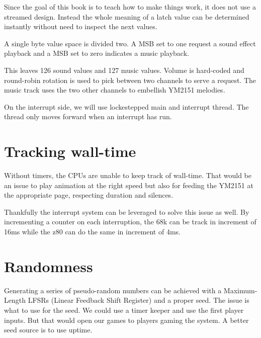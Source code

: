 Since the goal of this book is to teach how to make things work, it does not use a streamed design. Instead the whole meaning of a latch value can be determined instantly without need to inspect the next values.

A single byte value space is divided two. A MSB set to one  request a sound effect playback and a MSB set to zero  indicates a music playback. 

This leaves 126 sound values and 127 music values. Volume is hard-coded and round-robin rotation is used to pick between two channels to serve a request. The music track uses the two other channels to embellish YM2151 melodies. 

On the interrupt side, we will use lockestepped main and interrupt thread. The  thread only moves forward when an interrupt has run.

\pagebreak



\section{Tracking wall-time}

Without timers, the CPUs are unable to keep track of wall-time. That would be an issue to play animation at the right speed but also for feeding the YM2151 at the appropriate page, respecting duration and silences. 

Thankfully the interrupt system can be leveraged to solve this issue as well. By incrementing a counter on each interruption, the 68k can be track in increment of 16ms while the z80 can do the same in increment of 4ms.





\section{Randomness}
Generating a series of pseudo-random numbers can be achieved with a Maximum-Length LFSRs (Linear Feedback Shift Register) and a proper seed. The issue is what to use for the seed. We could use a timer keeper and use the first player inputs. But that would open our games to players gaming the system. A better seed source is to use uptime.

